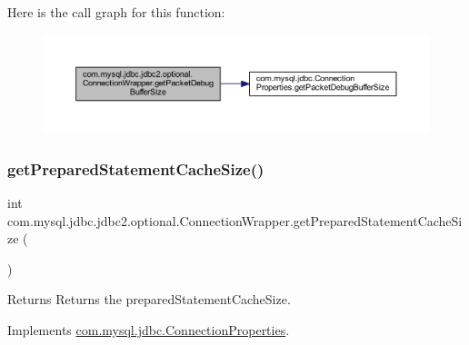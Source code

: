 Here is the call graph for this function\+:
\nopagebreak
\begin{figure}[H]
\begin{center}
\leavevmode
\includegraphics[width=350pt]{classcom_1_1mysql_1_1jdbc_1_1jdbc2_1_1optional_1_1_connection_wrapper_ad3f5f474a7148a078c7cb5ff6b9b1a9d_cgraph}
\end{center}
\end{figure}
\mbox{\label{classcom_1_1mysql_1_1jdbc_1_1jdbc2_1_1optional_1_1_connection_wrapper_ad7e993d7bc7cbf1913a836cdcbbdc0dc}} 
\subsubsection{\texorpdfstring{get\+Prepared\+Statement\+Cache\+Size()}{getPreparedStatementCacheSize()}}
{\footnotesize\ttfamily int com.\+mysql.\+jdbc.\+jdbc2.\+optional.\+Connection\+Wrapper.\+get\+Prepared\+Statement\+Cache\+Size (\begin{DoxyParamCaption}{ }\end{DoxyParamCaption})}

\begin{DoxyReturn}{Returns}
Returns the prepared\+Statement\+Cache\+Size. 
\end{DoxyReturn}


Implements \mbox{\hyperlink{interfacecom_1_1mysql_1_1jdbc_1_1_connection_properties_ad0bf062f59dcc82790e2d539c3a79924}{com.\+mysql.\+jdbc.\+Connection\+Properties}}.

